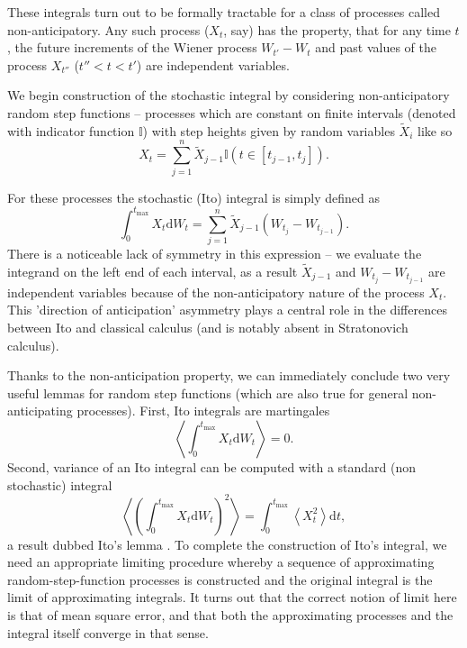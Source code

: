\documentclass{doctoral}
\newcommand{\dd}{\mathrm{d}}
\begin{document}
These integrals turn out to be formally tractable for a class of processes called non-anticipatory.
Any such process ($X_t$, say) has the property, that for any time $t$, the future increments of the Wiener process $W_{t'} - W_t$ and past values of the process $X_{t''}$ ($t'' < t < t'$) are independent variables.

We begin construction of the stochastic integral by considering non-anticipatory random step functions -- processes which are constant on finite intervals (denoted with indicator function $\mathbb{I}$) with step heights given by random variables $\widetilde{X}_{i}$ like so
\begin{equation}
    X_t = \sum_{j=1}^{n} \widetilde{X}_{j-1} \mathbb{I}(t \in [t_{j-1},t_j]).
    \label{eqn:random-step-function}
\end{equation}

For these processes the stochastic (Ito) integral is simply defined as
\begin{equation}
    \int_0^{t_{\mathrm{max}}} X_t \dd W_t = \sum_{j=1}^{n} \widetilde{X}_{j-1} (W_{t_j} - W_{t_{j-1}}).
    \label{eqn:ito-integral-step-function}
\end{equation}
There is a noticeable lack of symmetry in this expression -- we evaluate the integrand on the left end of each interval, as a result $\widetilde{X}_{j-1}$ and $W_{t_j} - W_{t_{j-1}}$ are independent variables because of the non-anticipatory nature of the process $X_t$.
This 'direction of anticipation' asymmetry plays a central role in the differences between Ito and classical calculus (and is notably absent in Stratonovich calculus).

Thanks to the non-anticipation property, we can immediately conclude two very useful lemmas for random step functions (which are also true for general non-anticipating processes).
First, Ito integrals are martingales
\begin{equation}
    \left< \int_0^{t_{\mathrm{max}}} X_t \dd W_t \right> = 0.
    \label{eqn:ito-integrals-are-martingales}
\end{equation}
Second, variance of an Ito integral can be computed with a standard (non stochastic) integral
\begin{equation}
    \left< \left( \int_0^{t_{\mathrm{max}}} X_t \dd W_t \right)^2 \right> = \int_{0}^{t_{\mathrm{max}}} \left< X_t^2 \right> \dd t, \label{eqn:itos-lemma}
\end{equation}
a result dubbed Ito's lemma \cite{Ito_1951}.
To complete the construction of Ito's integral, we need an appropriate limiting procedure whereby a sequence of approximating random-step-function processes is constructed and the original integral is the limit of approximating integrals.
It turns out that the correct notion of limit here is that of mean square error, and that both the approximating processes and the integral itself converge in that sense.
\end{document}
